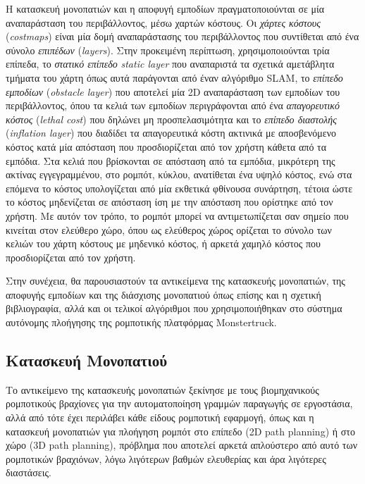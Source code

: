 \bigskip
Η κατασκευή μονοπατιών και η αποφυγή εμποδίων πραγματοποιούνται σε μία αναπαράσταση του περιβάλλοντος, μέσω χαρτών κόστους. Οι \textit{χάρτες κόστους} (\textit{costmaps}) είναι μία δομή αναπαράστασης του περιβάλλοντος που συντίθεται από ένα σύνολο \textit{επιπέδων} (\textit{layers}). Στην προκειμένη περίπτωση, χρησιμοποιούνται τρία επίπεδα, το \textit{στατικό επίπεδο} \textit{static layer} που αναπαριστά τα σχετικά αμετάβλητα τμήματα του χάρτη όπως αυτά παράγονται από έναν αλγόριθμο SLAM, το \textit{επίπεδο εμποδίων} (\textit{obstacle layer}) που αποτελεί μία 2D αναπαράσταση των εμποδίων του περιβάλλοντος, όπου τα κελιά των εμποδίων περιγράφονται από ένα \textit{απαγορευτικό κόστος} (\textit{lethal cost}) που δηλώνει μη προσπελασιμότητα και το \textit{επίπεδο διαστολής} (\textit{inflation layer}) που διαδίδει τα απαγορευτικά κόστη ακτινικά με αποσβενόμενο κόστος κατά μία απόσταση που προσδιορίζεται από τον χρήστη κάθετα από τα εμπόδια. Στα κελιά που βρίσκονται σε απόσταση από τα εμπόδια, μικρότερη της ακτίνας εγγεγραμμένου, στο ρομπότ, κύκλου, ανατίθεται ένα υψηλό κόστος, ενώ στα επόμενα το κόστος υπολογίζεται από μία εκθετικά φθίνουσα συνάρτηση, τέτοια ώστε το κόστος μηδενίζεται σε απόσταση ίση με την απόσταση που ορίστηκε από τον χρήστη. Με αυτόν τον τρόπο, το ρομπότ μπορεί να αντιμετωπίζεται σαν σημείο που κινείται στον ελεύθερο χώρο, όπου ως ελεύθερος χώρος ορίζεται το σύνολο των κελιών του χάρτη κόστους με μηδενικό κόστος, ή αρκετά χαμηλό κόστος που προσδιορίζεται από τον χρήστη.

\bigskip
Στην συνέχεια, θα παρουσιαστούν τα αντικείμενα της κατασκευής μονοπατιών, της αποφυγής εμποδίων και της διάσχισης μονοπατιού όπως επίσης και η σχετική βιβλιογραφία, αλλά και οι τελικοί αλγόριθμοι που χρησιμοποιήθηκαν στο σύστημα αυτόνομης πλοήγησης της ρομποτικής πλατφόρμας Monstertruck.

\subsection{Κατασκευή Μονοπατιού} \label{ssec:path_planning}
Το αντικείμενο της κατασκευής μονοπατιών ξεκίνησε με τους βιομηχανικούς ρομποτικούς βραχίονες για την αυτοματοποίηση γραμμών παραγωγής σε εργοστάσια, αλλά από τότε έχει περιλάβει κάθε είδους ρομποτική εφαρμογή, όπως και η κατασκευή μονοπατιών για πλοήγηση ρομπότ στο επίπεδο (2D path planning) ή στο χώρο (3D path planning), πρόβλημα που αποτελεί αρκετά απλούστερο από αυτό των ρομποτικών βραχιόνων, λόγω λιγότερων βαθμών ελευθερίας και άρα λιγότερες διαστάσεις.


